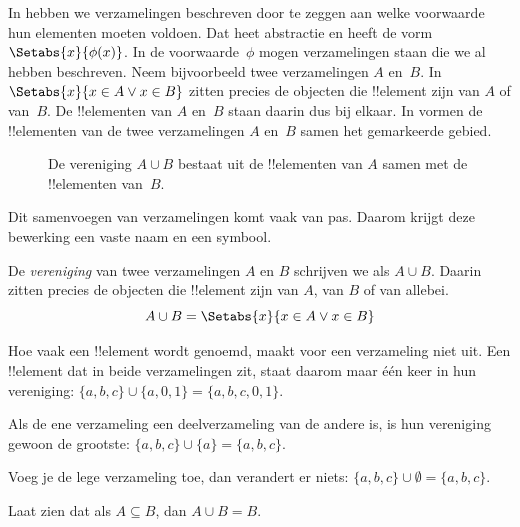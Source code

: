 \documentclass[../../../include/open-logic-section]{subfiles}
\begin{document}

\begin{explain}
In  hebben we verzamelingen beschreven door te
zeggen aan welke voorwaarde hun elementen moeten voldoen. Dat heet abstractie
en heeft de vorm $\Setabs{x}{\phi(x)}$. In de voorwaarde~$\phi$ mogen
verzamelingen staan die we al hebben beschreven. Neem bijvoorbeeld twee
verzamelingen $A$ en~$B$. In $\Setabs{x}{x \in A \lor x \in B}$ zitten precies
de objecten die !!{element} zijn van $A$ of van~$B$. De !!{element}en van $A$
en~$B$ staan daarin dus bij elkaar. In  vormen de
!!{element}en van de twee verzamelingen $A$ en~$B$ samen het gemarkeerde gebied.

\begin{figure}
  \caption{De vereniging $A \cup B$ bestaat uit de !!{element}en van $A$
   samen met de !!{element}en van~$B$.}
\end{figure}

Dit samenvoegen van verzamelingen komt vaak van pas. Daarom krijgt deze
bewerking een vaste naam en een symbool.
\end{explain}

\begin{defn}[Vereniging]
De \emph{vereniging} van twee verzamelingen $A$ en $B$ schrijven we als
$A \cup B$. Daarin zitten precies de objecten die !!{element} zijn van $A$,
van $B$ of van allebei.
\[
A \cup B = \Setabs{x}{x \in A \lor x \in B}
\]
\end{defn}

\begin{ex}
Hoe vaak een !!{element} wordt genoemd, maakt voor een verzameling niet uit.
Een !!{element} dat in beide verzamelingen zit, staat daarom maar één keer in
hun vereniging: $\{ a, b, c\} \cup \{ a, 0, 1\} = \{a, b, c, 0, 1\}$.

Als de ene verzameling een deelverzameling van de andere is, is hun vereniging
gewoon de grootste: $\{a, b, c \} \cup \{a \} = \{a, b, c\}$.

Voeg je de lege verzameling toe, dan verandert er niets: $\{a,
b, c \} \cup \emptyset = \{a, b, c \}$.
\end{ex}

\begin{prob}
Laat zien dat als $A \subseteq B$, dan $A \cup B = B$.
\end{prob}
\end{document}
